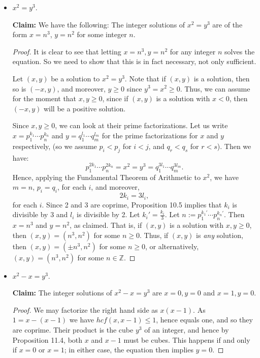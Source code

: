 \documentclass[11pt,dvipsnames]{book}
\numberwithin{equation}{section} %
\numberwithin{figure}{section} %
\numberwithin{table}{section} %
\begin{document}
\begin{exercise}
\begin{itemize}
\item $x^2 = y^3$.


\begin{solution}

{\bf Claim:} We have the following:
The integer solutions of $x^2=y^3$ are of the form $x=n^3$, $y=n^2$ for some integer $n$.


\begin{proof}
 It is clear to see that letting $x=n^3, y=n^2$ for any integer $n$ solves the equation.  So we need to show that this is in fact necessary, not only sufficient.

Let $(x,y)$ be a solution to $x^2=y^3$. Note that if $(x,y)$ is a solution, then so is $(-x,y)$, and moreover, $y\geq 0$ since $y^3=x^2\geq 0$. Thus, we can assume for the moment that $x,y\geq 0$, since if  $(x,y)$ is a solution with $x<0$, then $(-x,y)$ will be a positive solution. 

Since $x,y\geq 0$, we can look at their prime factorizations. Let us write $x=p_1^{k_1}\cdots p_n^{k_n}$ and $y=q_1^{l_1}\cdots q_m^{l_m}$ for the prime factorizations for $x$ and $y$ respectively, (so we assume $p_i<p_j$ for $i<j$, and $q_r<q_s$ for $r<s$).  Then we have:
$$p_1^{2k_1}\cdots p_n^{2k_n} = x^2=y^3 = q_1^{3l_1}\cdots q_m^{3l_m}.$$
Hence, applying the Fundamental Theorem of Arithmetic to $x^2$, we have $m=n$, $p_i=q_i$, for each $i$, and moreover,
$$2k_i=3l_i,$$
for each $i$.  Since 2 and 3 are coprime, Proposition 10.5 implies that $k_i$ is divisible by 3 and $l_i$ is divisible by 2.  Let $k_i'=\frac{k_i}{3}$.  Let $n:= p_1^{k_1'}\cdots p_n^{k_n'}.$  Then $x=n^3$ and $y=n^2$, as claimed. That is, if $(x,y)$ is a solution with $x,y\geq 0$, then $(x,y)=(n^3,n^2)$ for some $n\geq 0$. Thus, if $(x,y)$ is {\it any } solution, then $(x,y)=(\pm n^3,n^2)$ for some $n\geq 0$, or alternatively, $(x,y)=(n^3,n^2)$ for some $n\in \mathbb{Z}$. 
\end{proof}


\end{solution}



\item $x^2-x=y^3$.


\begin{solution}


{\bf Claim:} The integer solutions of $x^2-x=y^3$ are $x=0,y=0$ and $x=1,y=0$.

\begin{proof}
We may factorize the right hand side as $x(x-1)$.  As $1 = x - (x-1)$ we have $hcf(x,x-1)\leq 1$, hence equals one, and so they are coprime.  Their product is the cube $y^3$ of an integer, and hence by Proposition 11.4, both $x$ and $x-1$ must be cubes.  This happens if and only if $x=0$ or $x=1$; in either case, the equation then implies $y=0$.
\end{proof}
\end{solution}


\end{itemize}
\end{exercise}
\end{document}
